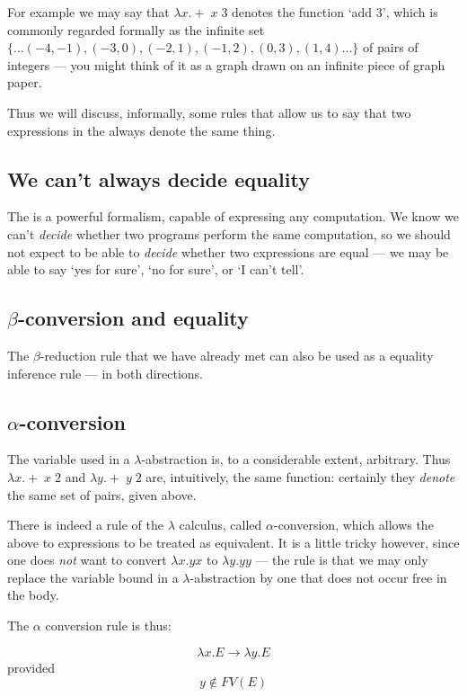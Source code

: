 For example we may say that $\lambda x. +\; x\; 3$ denotes the
function `add 3', which is commonly regarded formally as the infinite set
$\{\ldots (-4,-1), (-3,0), (-2,1),(-1,2),(0,3),(1,4)\ldots\}$ of pairs of
integers --- you might think of it as a graph drawn on an infinite piece of
graph paper.

Thus we will discuss, informally, some rules that allow us to say that two
expressions in the \LC always denote the same thing.

\subsection{We can't always decide equality}

The \LC is a powerful formalism, capable of expressing any computation. We
know we can't {\em decide} whether two programs perform the same
computation, so we should not expect to be able to {\em decide} whether two
\LC expressions are equal --- we may be able to say `yes for sure', `no for
sure', or `I can't tell'.


\subsection{$\beta$-conversion and equality}

The $\beta$-reduction rule that we have already met can also be used as a
equality inference rule --- in both directions.

\subsection{$\alpha$-conversion}

The variable used in a $\lambda$-abstraction is, to a considerable extent,
arbitrary. Thus $\lambda x. +\;x\;2$ and $\lambda y. +\;y\;2$ are,
intuitively, the same function: certainly they {\em denote} the same set of
pairs, given above.

There is indeed a rule of the $\lambda$
calculus, called $\alpha$-conversion, which allows the above to expressions
to be treated as equivalent. It is a little tricky however, since one does
{\em not} want to convert $\lambda x. y x$ to $\lambda y. y y$
--- the rule is that we may only replace the variable bound in a
$\lambda$-abstraction by one that does not occur free in the body.

The $\alpha$ conversion rule is thus:

$$\lambda x.E \longrightarrow \lambda y.E$$ provided $$y\not\in FV(E)$$


